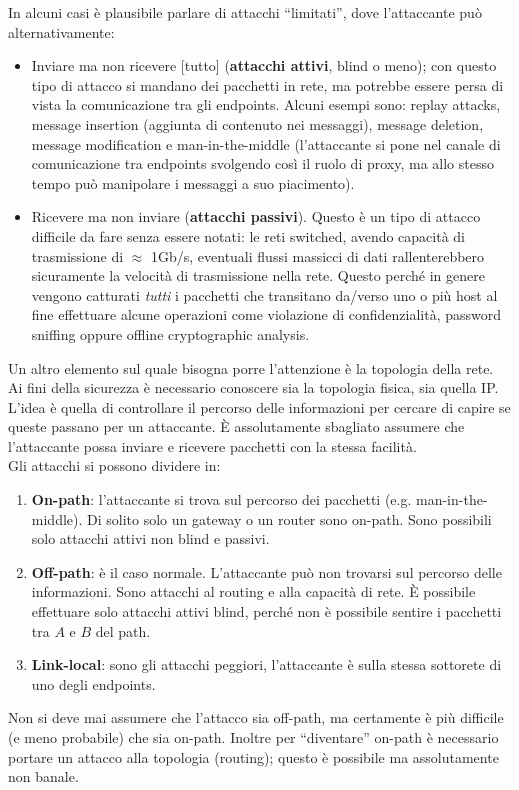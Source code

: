 In alcuni casi è plausibile parlare di attacchi “limitati”, dove l'attaccante può alternativamente:
\begin{itemize}
	\item Inviare ma non ricevere [tutto] (\textbf{attacchi attivi}, blind o meno); con questo tipo di attacco si mandano dei pacchetti in rete, ma potrebbe essere persa di vista la comunicazione tra gli endpoints. Alcuni esempi sono: replay attacks, message insertion (aggiunta di contenuto nei messaggi), message deletion, message modification e man-in-the-middle (l'attaccante si pone nel canale di comunicazione tra endpoints svolgendo così il ruolo di proxy, ma allo stesso tempo può manipolare i messaggi a suo piacimento).
	\item Ricevere ma non inviare (\textbf{attacchi passivi}). Questo è un tipo di attacco difficile da fare senza essere notati: le reti switched, avendo capacità di trasmissione di $\approx$ 1Gb/s, eventuali flussi massicci di dati rallenterebbero sicuramente la velocità di trasmissione nella rete. Questo perché in genere vengono catturati \textit{tutti} i pacchetti che transitano da/verso uno o più host al fine effettuare alcune operazioni come violazione di confidenzialità, password sniffing oppure offline cryptographic analysis.
\end{itemize}
Un altro elemento sul quale bisogna porre l'attenzione è la topologia della rete. Ai fini della sicurezza è necessario conoscere sia la topologia fisica, sia quella IP. L'idea è quella di controllare il percorso delle informazioni per cercare di capire se queste passano per un attaccante. È assolutamente sbagliato assumere che l'attaccante possa inviare e ricevere pacchetti con la stessa facilità.\\
Gli attacchi si possono dividere in:
\begin{enumerate}
	\item \textbf{On-path}: l'attaccante si trova sul percorso dei pacchetti (e.g. man-in-the-middle). Di solito solo un gateway o un router sono on-path. Sono possibili solo attacchi attivi non blind e passivi.
	\item \textbf{Off-path}: è il caso normale. L'attaccante può non trovarsi sul percorso delle informazioni. Sono attacchi al routing e alla capacità di rete. È possibile effettuare solo attacchi attivi blind, perché non è possibile sentire i pacchetti tra $A$ e $B$ del path.
	\item \textbf{Link-local}: sono gli attacchi peggiori, l'attaccante è sulla stessa sottorete di uno degli endpoints.
\end{enumerate}
Non si deve mai assumere che l'attacco sia off-path, ma certamente è più difficile (e meno probabile) che sia on-path. Inoltre per “diventare” on-path è necessario portare un attacco alla topologia (routing); questo è possibile ma assolutamente non banale.
\newpage

